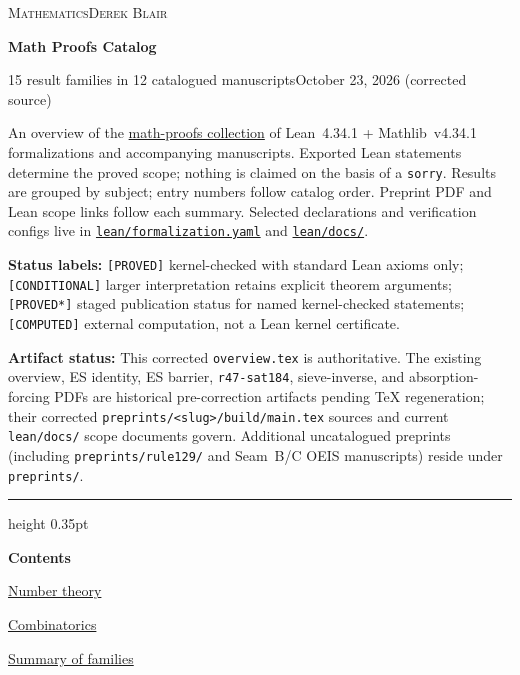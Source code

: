 \documentclass[11pt,a4paper]{article}
\begin{document}
\thispagestyle{firstpage}
{\small\scshape Mathematics\hfill Derek Blair\par}
\vspace{5pt}
{\LARGE\bfseries Math Proofs Catalog\par}
\vspace{4pt}
{\small 15 result families in 12 catalogued manuscripts\hfill October 23, 2026 (corrected source)\par}
\vspace{7pt}
{\small An overview of the \href{https://github.com/derekblair/math-proofs}{math-proofs collection} of Lean~4.34.1 + Mathlib~v4.34.1 formalizations and accompanying manuscripts. Exported Lean statements determine the proved scope; nothing is claimed on the basis of a \texttt{sorry}. Results are grouped by subject; entry numbers follow catalog order. Preprint PDF and Lean scope links follow each summary. Selected declarations and verification configs live in \href{https://github.com/derekblair/math-proofs/blob/master/lean/formalization.yaml}{\texttt{lean/formalization.yaml}} and \href{https://github.com/derekblair/math-proofs/tree/master/lean/docs}{\texttt{lean/docs/}}.\par}
\vspace{6pt}
{\footnotesize\color{muted}\textbf{Status labels:} \texttt{[PROVED]} kernel-checked with standard Lean axioms only; \texttt{[CONDITIONAL]} larger interpretation retains explicit theorem arguments; \texttt{[PROVED*]} staged publication status for named kernel-checked statements; \texttt{[COMPUTED]} external computation, not a Lean kernel certificate.\par}
\vspace{4pt}
{\footnotesize\color{muted}\textbf{Artifact status:} This corrected \texttt{overview.tex} is authoritative. The existing overview, ES identity, ES barrier, \texttt{r47-sat184}, sieve-inverse, and absorption-forcing PDFs are historical pre-correction artifacts pending TeX regeneration; their corrected \texttt{preprints/<slug>/build/main.tex} sources and current \texttt{lean/docs/} scope documents govern. Additional uncatalogued preprints (including \texttt{preprints/rule129/} and Seam~B/C OEIS manuscripts) reside under \texttt{preprints/}.\par}
\vspace{8pt}\hrule height 0.35pt\vspace{5pt}

{\large\bfseries Contents\par}
\vspace{7pt}
\noindent\hyperlink{subject1}{Number theory}\nobreak\hfill\pageref*{subject1}\par\vspace{5pt}
\noindent\hyperlink{subject2}{Combinatorics}\nobreak\hfill\pageref*{subject2}\par\vspace{5pt}
\noindent\hyperlink{subject3}{Summary of families}\nobreak\hfill\pageref*{subject3}\par\vspace{5pt}
\end{document}
